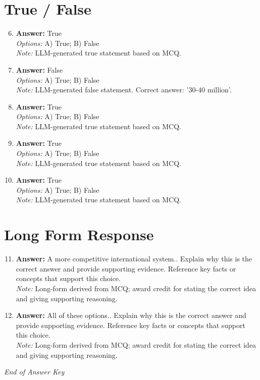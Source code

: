 \documentclass[12pt]{article}
\begin{document}
\section*{True / False}
\begin{enumerate}[label=\arabic*.]
\setcounter{enumi}{5}
\item \textbf{Answer:} True
\\ \textit{Options:} A) True; B) False
\\ \textit{Note:} LLM-generated true statement based on MCQ.
\item \textbf{Answer:} False
\\ \textit{Options:} A) True; B) False
\\ \textit{Note:} LLM-generated false statement. Correct answer: '30-40 million'.
\item \textbf{Answer:} True
\\ \textit{Options:} A) True; B) False
\\ \textit{Note:} LLM-generated true statement based on MCQ.
\item \textbf{Answer:} True
\\ \textit{Options:} A) True; B) False
\\ \textit{Note:} LLM-generated true statement based on MCQ.
\item \textbf{Answer:} True
\\ \textit{Options:} A) True; B) False
\\ \textit{Note:} LLM-generated true statement based on MCQ.
\end{enumerate}

\section*{Long Form Response}
\begin{enumerate}[label=\arabic*.]
\setcounter{enumi}{10}
\item \textbf{Answer:} A more competitive international system.. Explain why this is the correct answer and provide supporting evidence. Reference key facts or concepts that support this choice.
\\ \textit{Note:} Long-form derived from MCQ; award credit for stating the correct idea and giving supporting reasoning.
\item \textbf{Answer:} All of these options.. Explain why this is the correct answer and provide supporting evidence. Reference key facts or concepts that support this choice.
\\ \textit{Note:} Long-form derived from MCQ; award credit for stating the correct idea and giving supporting reasoning.
\end{enumerate}

\vfill
\noindent\textit{End of Answer Key}
\end{document}
